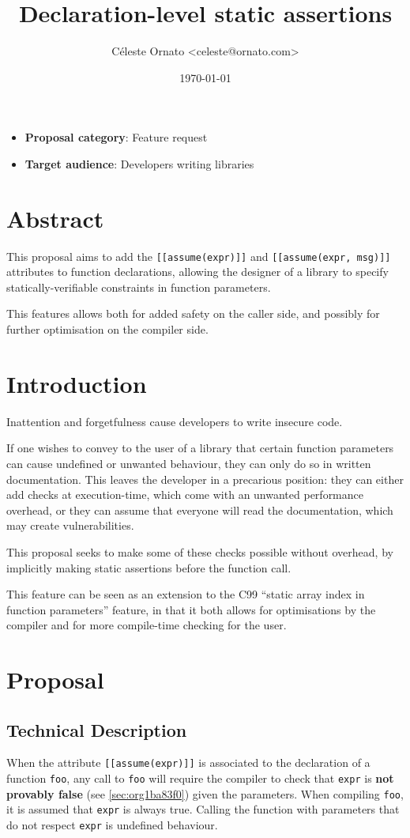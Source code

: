 \documentclass[a4paper, 12pt]{article}
\author{Céleste Ornato <celeste@ornato.com>}
\date{\today}
\title{Declaration-level static assertions}
\begin{document}
\maketitle
\begin{itemize}
\item \textbf{Proposal category}: Feature request
\item \textbf{Target audience}: Developers writing libraries
\end{itemize}
\section{Abstract}
\label{sec:org5bd3413}
This proposal aims to add the \texttt{[[assume(expr)]]} and \texttt{[[assume(expr, msg)]]}
attributes to function declarations, allowing the designer of a library to specify
statically-verifiable constraints in function parameters.

This features allows both for added safety on the caller side, and possibly for
further optimisation on the compiler side.
\section{Introduction}
\label{sec:orga8228cd}
Inattention and forgetfulness cause developers to write insecure code.

If one wishes to convey to the user of a library that certain function parameters
can cause undefined or unwanted behaviour, they can only do so in written
documentation. This leaves the developer in a precarious position: they can
either add checks at execution-time, which come with an unwanted performance overhead,
or they can assume that everyone will read the documentation, which may create
vulnerabilities.

This proposal seeks to make some of these checks possible without overhead, by implicitly
making static assertions before the function call.

This feature can be seen as an extension to the C99 ``static array index in
function parameters'' feature, in that it both allows for optimisations by the
compiler and for more compile-time checking for the user.
\section{Proposal}
\label{sec:org2a6889a}
\subsection{Technical Description}
\label{sec:org807dffc}
When the attribute \texttt{[[assume(expr)]]} is associated to the declaration of a
function \texttt{foo}, any call to \texttt{foo} will require the compiler to check that \texttt{expr}
is \textbf{not provably false} (see \ref{sec:org1ba83f0}) given the parameters.
When compiling \texttt{foo}, it is assumed that \texttt{expr} is always true. Calling the
function with parameters that do not respect \texttt{expr} is undefined behaviour.
\end{document}
